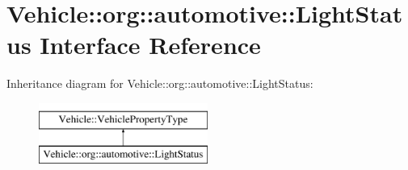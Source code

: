 \hypertarget{interfaceVehicle_1_1org_1_1automotive_1_1LightStatus}{\section{Vehicle\-:\-:org\-:\-:automotive\-:\-:Light\-Status Interface Reference}
\label{interfaceVehicle_1_1org_1_1automotive_1_1LightStatus}
}
Inheritance diagram for Vehicle\-:\-:org\-:\-:automotive\-:\-:Light\-Status\-:\begin{figure}[H]
\begin{center}
\leavevmode
\includegraphics[height=2.000000cm]{interfaceVehicle_1_1org_1_1automotive_1_1LightStatus}
\end{center}
\end{figure}
